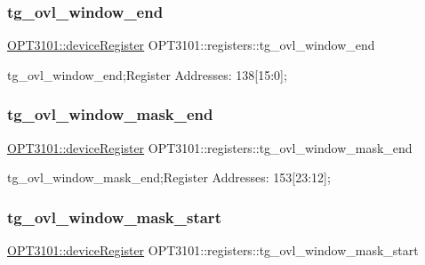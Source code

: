 \subsubsection{\texorpdfstring{tg\+\_\+ovl\+\_\+window\+\_\+end}{tg\_ovl\_window\_end}}
{\footnotesize\ttfamily \mbox{\hyperlink{class_o_p_t3101_1_1device_register}{O\+P\+T3101\+::device\+Register}} O\+P\+T3101\+::registers\+::tg\+\_\+ovl\+\_\+window\+\_\+end}



tg\+\_\+ovl\+\_\+window\+\_\+end;Register Addresses\+: 138\mbox{[}15\+:0\mbox{]}; 

\mbox{\label{class_o_p_t3101_1_1registers_aec4f1ad9cea554d2ab16e0808ac25b49}} 
\subsubsection{\texorpdfstring{tg\+\_\+ovl\+\_\+window\+\_\+mask\+\_\+end}{tg\_ovl\_window\_mask\_end}}
{\footnotesize\ttfamily \mbox{\hyperlink{class_o_p_t3101_1_1device_register}{O\+P\+T3101\+::device\+Register}} O\+P\+T3101\+::registers\+::tg\+\_\+ovl\+\_\+window\+\_\+mask\+\_\+end}



tg\+\_\+ovl\+\_\+window\+\_\+mask\+\_\+end;Register Addresses\+: 153\mbox{[}23\+:12\mbox{]}; 

\mbox{\label{class_o_p_t3101_1_1registers_a990dca0856bffa9f6b8050a0630583bc}} 
\subsubsection{\texorpdfstring{tg\+\_\+ovl\+\_\+window\+\_\+mask\+\_\+start}{tg\_ovl\_window\_mask\_start}}
{\footnotesize\ttfamily \mbox{\hyperlink{class_o_p_t3101_1_1device_register}{O\+P\+T3101\+::device\+Register}} O\+P\+T3101\+::registers\+::tg\+\_\+ovl\+\_\+window\+\_\+mask\+\_\+start}



